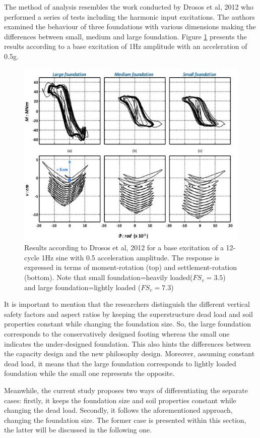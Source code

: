 The method of analysis resembles the work conducted by Drosos et al, 2012 \cite{drosos2012soil} who performed a series of tests including the harmonic input excitations. The authors \mbox{examined} the behaviour of three foundations with various dimensions making the \mbox{differences} between small, medium and large foundation. Figure \ref{drosos} presents the results according to a base excitation of 1Hz amplitude with an acceleration of 0.5g.

\begin{figure}
	\centering
	\includegraphics[width=0.65\linewidth]{"drosos2"}
	\caption{Results according to Drosos et al, 2012 for a base excitation of a 12-cycle 1Hz sine with 0.5 acceleration amplitude. The response is expressed in terms of moment-rotation (top) and settlement-rotation (bottom). Note that small foundation=heavily loaded($FS_v=3.5$) and large foundation=lightly loaded ($FS_v=7.3$)}
	\label{drosos}
\end{figure}

\newpage
It is important to mention that the researchers distinguish the different vertical safety factors and aspect ratios by keeping the superstructure dead load and soil properties constant while changing the foundation size. So, the large foundation corresponds to the \mbox{conservatively} designed footing whereas the small one indicates the under-designed foundation. This also hints the differences between the capacity design and the new \mbox{philosophy} design. Moreover, assuming constant dead load, it means that the large foundation corresponds to lightly loaded foundation while the small one represents the opposite. 

Meanwhile, the current study proposes two ways of differentiating the separate cases: firstly, it keeps the foundation size and soil properties constant while changing the dead load. Secondly, it follows the aforementioned approach, changing the foundation size. The former case is presented within this section, the latter will be discussed in the following one.

